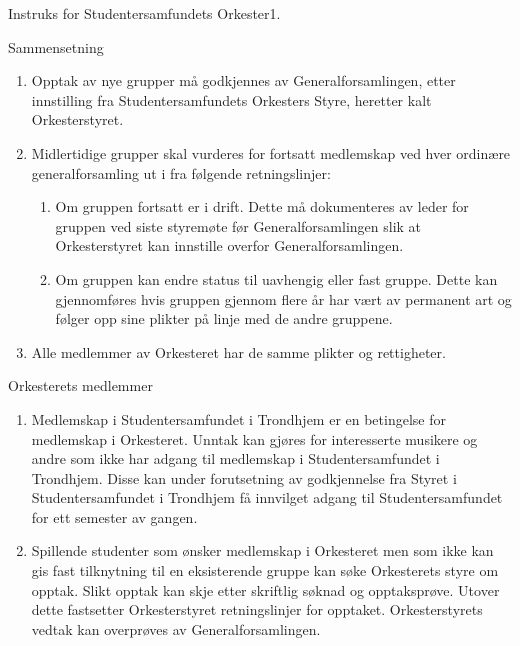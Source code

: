 \begin{instruks}{Instruks for Studentersamfundets Orkester}{1. }{ }
\begin{instruksledd}{Sammensetning}
\begin{enumerate}
            \item Opptak av nye grupper må godkjennes av Generalforsamlingen, etter innstilling fra
                Studentersamfundets
                Orkesters Styre, heretter kalt Orkesterstyret.

            \item Midlertidige grupper skal vurderes for fortsatt medlemskap ved hver ordinære
                generalforsamling ut i fra
                følgende retningslinjer:
                \begin{enumerate}
                    \item Om gruppen fortsatt er i drift. Dette må dokumenteres av leder for gruppen ved
                        siste styremøte før
                        Generalforsamlingen slik at Orkesterstyret kan innstille overfor Generalforsamlingen.
                    \item Om gruppen kan endre status til uavhengig eller fast gruppe. Dette kan
                        gjennomføres hvis gruppen
                        gjennom flere år har vært av permanent art og følger opp sine plikter på linje med de andre
                        gruppene.
                \end{enumerate}
            \item Alle medlemmer av Orkesteret har de samme plikter og rettigheter.
        \end{enumerate}
    \end{instruksledd}

    \begin{instruksledd}{Orkesterets medlemmer}
        \begin{enumerate}
            \item Medlemskap i Studentersamfundet i Trondhjem er en betingelse for medlemskap i
                Orkesteret. Unntak kan
                gjøres for interesserte musikere og andre som ikke har adgang til medlemskap i Studentersamfundet i
                Trondhjem. Disse kan under forutsetning av godkjennelse fra Styret i Studentersamfundet i Trondhjem
                få
                innvilget adgang til Studentersamfundet for ett semester av gangen.
            \item Spillende studenter som ønsker medlemskap i Orkesteret men som ikke kan gis fast
                tilknytning til en
                eksisterende gruppe kan søke Orkesterets styre om opptak. Slikt opptak kan skje etter skriftlig
                søknad og
                opptaksprøve. Utover dette fastsetter Orkesterstyret retningslinjer for opptaket. Orkesterstyrets
                vedtak kan
                overprøves av Generalforsamlingen.
        \end{enumerate}
    \end{instruksledd}


\end{instruks}
